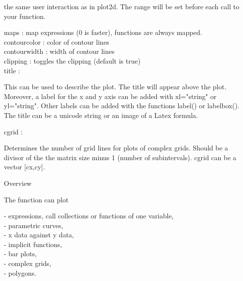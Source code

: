 \documentclass[a4paper,10pt]{article}
\begin{document}
\begin{eulernotebook}
\begin{eulerttcomment}
  the same user interaction as in plot2d. The range will be set
  before each call to your function.
\end{eulerttcomment}
\begin{eulercomment}
maps      : map expressions (0 is faster), functions are always
mapped.\\
contourcolor : color of contour lines\\
contourwidth : width of contour lines\\
clipping  : toggles the clipping (default is true)\\
title     :\\
\end{eulercomment}
\begin{eulerttcomment}
  This can be used to describe the plot. The title will appear above
  the plot. Moreover, a label for the x and y axis can be added with
  xl="string" or yl="string". Other labels can be added with the
  functions label() or labelbox(). The title can be a unicode
  string or an image of a Latex formula.
\end{eulerttcomment}
\begin{eulercomment}
cgrid     :\\
\end{eulercomment}
\begin{eulerttcomment}
  Determines the number of grid lines for plots of complex grids.
  Should be a divisor of the the matrix size minus 1 (number of
  subintervals). cgrid can be a vector [cx,cy].
\end{eulerttcomment}
\begin{eulercomment}

Overview

The function can plot

- expressions, call collections or functions of one variable,\\
- parametric curves,\\
- x data against y data,\\
- implicit functions,\\
- bar plots,\\
- complex grids,\\
- polygons.


\end{eulercomment}
\end{eulernotebook}
\end{document}
